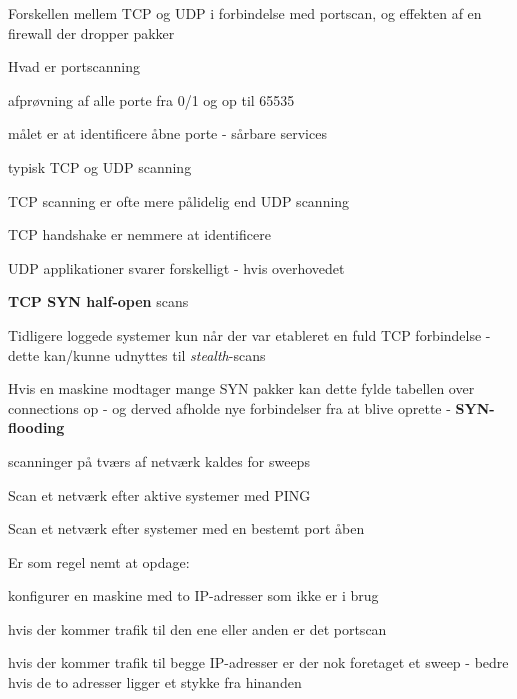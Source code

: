 










Forskellen mellem TCP og UDP i forbindelse med portscan, og effekten af en firewall der dropper pakker


\begin{list1}
  \item Hvad er portscanning
\item afprøvning af alle porte fra 0/1 og op til 65535
\item målet er at identificere åbne porte - sårbare services
\item typisk TCP og UDP scanning
\item TCP scanning er ofte mere pålidelig end UDP scanning
\end{list1}

{\hlkbig TCP handshake er nemmere at identificere

UDP applikationer svarer forskelligt - hvis overhovedet}



\begin{list2}
\item {\bfseries TCP SYN half-open} scans
\item Tidligere loggede systemer kun når der var etableret en fuld TCP
  forbindelse - dette kan/kunne udnyttes til \emph{stealth}-scans
\item Hvis en maskine modtager mange SYN pakker kan dette fylde
  tabellen over connections op - og derved afholde nye forbindelser
  fra at blive oprette - {\bfseries SYN-flooding}
\end{list2}



\begin{list1}
\item scanninger på tværs af netværk kaldes for sweeps 
\item Scan et netværk efter aktive systemer med PING
\item Scan et netværk efter systemer med en bestemt port åben
\item Er som regel nemt at opdage:
  \begin{list2}
    \item konfigurer en maskine med to IP-adresser som ikke er i brug
\item hvis der kommer trafik til den ene eller anden er det portscan
\item hvis der kommer trafik til begge IP-adresser er der nok
  foretaget et sweep - bedre hvis de to adresser ligger et stykke fra hinanden
  \end{list2}

\end{list1}

